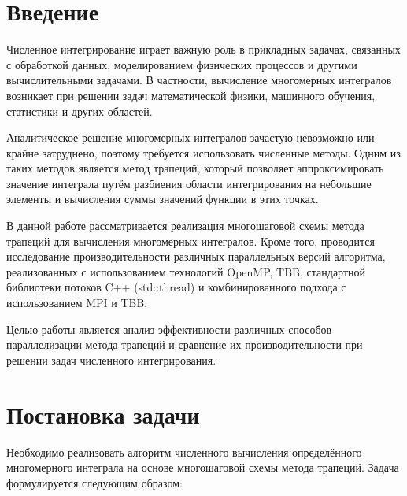 \documentclass[a4paper,14pt]{article}
\begin{document}
\newpage
\section{Введение}

Численное интегрирование играет важную роль в прикладных задачах, связанных с обработкой данных, моделированием физических процессов и другими вычислительными задачами. В частности, вычисление многомерных интегралов возникает при решении задач математической физики, машинного обучения, статистики и других областей.

Аналитическое решение многомерных интегралов зачастую невозможно или крайне затруднено, поэтому требуется использовать численные методы. Одним из таких методов является метод трапеций, который позволяет аппроксимировать значение интеграла путём разбиения области интегрирования на небольшие элементы и вычисления суммы значений функции в этих точках.

В данной работе рассматривается реализация многошаговой схемы метода трапеций для вычисления многомерных интегралов. Кроме того, проводится исследование производительности различных параллельных версий алгоритма, реализованных с использованием технологий OpenMP, TBB, стандартной библиотеки потоков C++ (std::thread) и комбинированного подхода с использованием MPI и TBB.

Целью работы является анализ эффективности различных способов параллелизации метода трапеций и сравнение их производительности при решении задач численного интегрирования.

\newpage
\section{Постановка задачи}

Необходимо реализовать алгоритм численного вычисления определённого многомерного интеграла на основе многошаговой схемы метода трапеций. Задача формулируется следующим образом:
\end{document}
